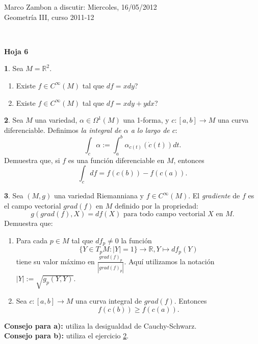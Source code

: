 \documentclass[12pt,a4paper]{report}
\theoremstyle{definition}
\newtheorem{ex}{}
\newcommand{\RR}{\ensuremath{\mathbb R}}
\begin{document}
\noindent
{\sffamily\large Marco Zambon 
\hfill   a discutir:   Miercoles, 16/05/2012\\Geometr\'ia III, curso 2011-12}
 

\noindent
\hrulefill{}\\
\begin{center}\bfseries\large\textsf{Hoja 6    \vspace{-2mm}}
\end{center}

\noindent
% 

 
 \begin{ex} Sea $M=\RR^2$. 
 \begin{enumerate}
\item Existe $f\in C^{\infty}(M)$ tal que $df=x dy$?
\item Existe $f\in C^{\infty}(M)$ tal que $df=x dy+y dx$?
\end{enumerate}
\end{ex}
 
\begin{ex} \label{int}
Sea $M$ una variedad, $\alpha\in \Omega^1(M)$ una 1-forma, y 
$c \colon [a,b]\to M$ una curva diferenciable. Definimos  \emph{la integral de $\alpha$ a lo largo de $c$}:
$$\int_c\alpha:=\int_a^b \alpha_{c(t)}(\dot{c}(t)) dt.$$
Demuestra que, si $f$ es una funci\'on diferenciable en $M$, entonces
$$\int_{c} df=f(c(b))-f(c(a)).$$ 
\end{ex}



\begin{ex} 
Sea $(M,g)$ una variedad Riemanniana y $f \in C^{\infty}(M)$. El \emph{gradiente} de $f$ es el campo vectorial $grad(f)$ en $M$ definido por la propriedad:
$$g(grad(f),X)=df(X) \text{ para todo campo vectorial $X$ en $M$}.$$
Demuestra que:
\begin{enumerate}
\item Para cada $p\in M$ tal que $df_p \neq 0$   la funci\'on
$$\{Y\in T_pM : |Y|=1\}\to \RR, Y \mapsto df_p(Y)$$
tiene su valor m\'aximo en $\frac{grad(f)_p}{|{grad(f)_p}|}$. Aqu\'i utilizamos la notaci\'on $|Y|:=\sqrt{g_p(Y,Y)}$.
\item Sea $c \colon [a,b] \to M$ una curva integral de $grad(f)$. Entonces $$f(c(b))\ge f(c(a)).$$
\end{enumerate}


\noindent\textbf{Consejo para a):} utiliza la desigualdad de Cauchy-Schwarz.\\
\noindent\textbf{Consejo para b):} utiliza el ejercicio \ref{int}.
\end{ex}
\end{document}
